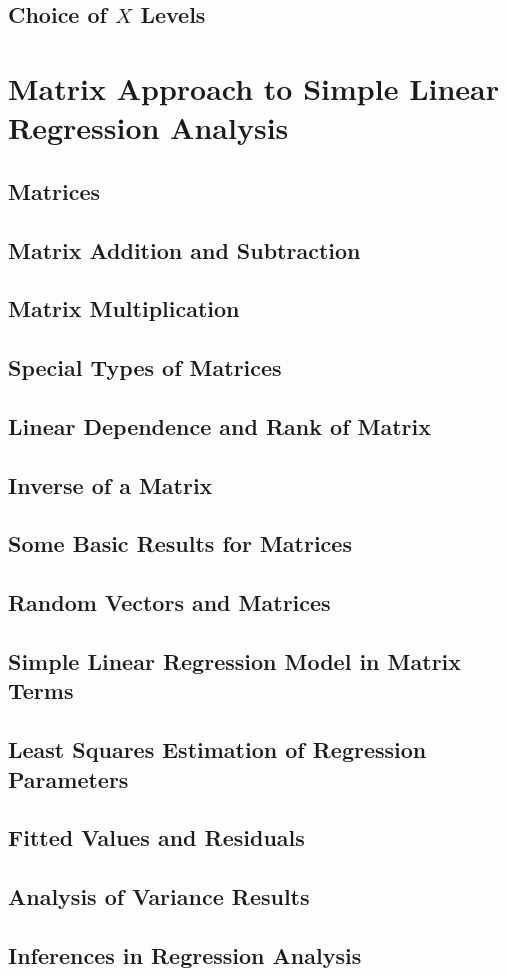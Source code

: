 \subsection{Choice of $X$ Levels}


\section{Matrix Approach to Simple Linear Regression Analysis}
\subsection{Matrices}

\subsection{Matrix Addition and Subtraction}

\subsection{Matrix Multiplication}

\subsection{Special Types of Matrices}

\subsection{Linear Dependence and Rank of Matrix}

\subsection{Inverse of a Matrix}

\subsection{Some Basic Results for Matrices}

\subsection{Random Vectors and Matrices}

\subsection{Simple Linear Regression Model in Matrix Terms}

\subsection{Least Squares Estimation of Regression Parameters}

\subsection{Fitted Values and Residuals}

\subsection{Analysis of Variance Results}

\subsection{Inferences in Regression Analysis}

